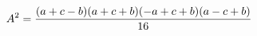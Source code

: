 \documentclass[preview]{standalone}
\begin{document}
\begin{align*}
\special{dvisvgm:raw <g id='unique000'>}A^2 = \frac{(a+c-b)(a+c+b)(-a+c+b)(a-c+b)}{16}\special{dvisvgm:raw </g>}
\end{align*}
\end{document}
